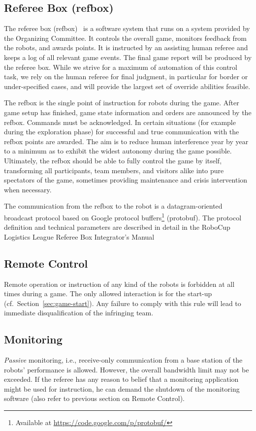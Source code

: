 \documentclass[12pt,twoside]{article}
\newcommand{\refsec}[1]{Section~\ref{#1}}
\begin{document}
\subsection{Referee Box (refbox)}
\label{sec:referee-box}
The referee box (refbox)~\cite{RCI-RefBox} is a software system that runs on a
system provided by the Organizing Committee. It controls the overall game,
monitors feedback from the robots, and awards points. It is instructed by an
assisting human referee and keeps a log of all relevant game events. The final
game report will be produced by the referee box. While we strive for a maximum
of automation of this control task, we rely on the human referee for final
judgment, in particular for border or under-specified cases, and will provide
the largest set of override abilities feasible.

The refbox is the single point of instruction for robots during the
game. After game setup has finished, game state information and orders
are announced by the refbox. Commands must be acknowledged. In certain
situations (for example during the exploration phase) for successful
and true communication with the refbox points are awarded. The aim is
to reduce human interference year by year to a minimum as to exhibit
the widest autonomy during the game possible. Ultimately, the refbox
should be able to fully control the game by itself, transforming all
participants, team members, and visitors alike into pure spectators of
the game, sometimes providing maintenance and crisis intervention when
necessary.

The communication from the refbox to the robot is a datagram-oriented
broadcast protocol based on Google protocol buffers\footnote{Available
  at \url{https://code.google.com/p/protobuf/}} (protobuf). The
protocol definition and technical parameters are described in detail
in the RoboCup Logistics League Referee Box Integrator's
Manual~\cite{RefBoxIntManual}

\subsection{Remote Control}
\label{sec:remote-control}
Remote operation or instruction of any kind of the robots is forbidden
at all times during a game. The only allowed interaction is for the
start-up (cf.~\refsec{sec:game-start}). Any failure to comply with
this rule will lead to immediate disqualification of the infringing
team.

\subsection{Monitoring}
\label{sec:monitoring}
\emph{Passive} monitoring, i.e., receive-only communication from a base
station of the robots' performance is allowed. However, the overall
bandwidth limit may not be exceeded.
If the referee has any reason to belief that a monitoring application
might be used for instruction, he can demand the shutdown of the
monitoring software (also refer to previous section on Remote
Control).
\end{document}
